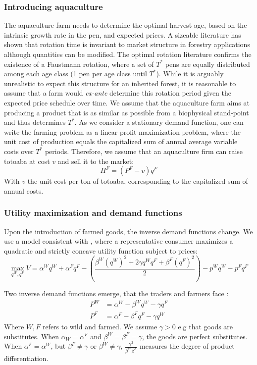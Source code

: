 \subsubsection{Introducing aquaculture}
\label{subsec:aquaculture}
The aquaculture farm needs to determine the optimal harvest age, based on the intrinsic growth rate in the pen, and expected prices. A sizeable literature has shown that rotation time is invariant to market structure in forestry applications \citep{faustmann1849, mitra_faustmann_1986} although quantities can be modified. The optimal rotation literature confirms the existence of a Faustmann rotation, where a set of $T^*$ pens are equally distributed among each age class (1 pen per age class until $T^*$). While it is arguably unrealistic to expect this structure for an inherited forest, it is reasonable to assume that a farm would \textit{ex-ante} determine this rotation period given the expected price schedule over time. We assume that the aquaculture farm aims at producing a product that is as similar as possible from a biophysical stand-point and thus determines $T^*$.
As we consider a stationary demand function, one can write the farming problem as a linear profit maximization problem, where the unit cost of production equals the capitalized sum of annual average variable costs over $T^*$ periods. 
Therefore, we assume that an aquaculture firm can raise totoaba at cost $v$ and sell it to the market: 
\begin{equation}
    \Pi^F = (P^F- v)q^F
    \label{eq:profit_aquaculture}
\end{equation}
With $v$ the unit cost per ton of totoaba, corresponding to the capitalized sum of annual costs. 

\subsubsection{Utility maximization and demand functions}
Upon the introduction of farmed goods, the inverse demand functions change. 
We use a model consistent with \citep{singh_price_1984}, where a representative consumer maximizes  a quadratic and strictly concave utility function subject to prices: 
\begin{equation}
    \max_{q^W, q^F}V = \alpha^W q^W + \alpha^F q^F - \left(\frac{\beta^W (q^W)^2 + 2\gamma q^W q^F +\beta^F (q^F)^2}{2}\right) - p^Wq^W - p^Fq^F
\end{equation}

Two inverse demand functions emerge, that the traders and farmers face : 
\begin{align}
P^W &= \alpha^W- \beta^W q^W - \gamma q^F \label{eq:demand_wild}\\
P^F &= \alpha^F
 - \beta^F q^F - \gamma q^W \label{eq:demand_farmed}
\end{align}
Where $W, F$ refers to wild and farmed. We assume $\gamma>0$ e.g that goods are substitutes. When $\alpha_W = \alpha^F$ and $\beta^W = \beta^F = \gamma$, the goods are perfect substitutes. When $\alpha^F = \alpha^W$, but $\beta^F \neq \gamma$ or $\beta^W \neq \gamma$,  $\frac{\gamma^2}{\beta^W \beta^F}$ measures the degree of product differentiation. 


